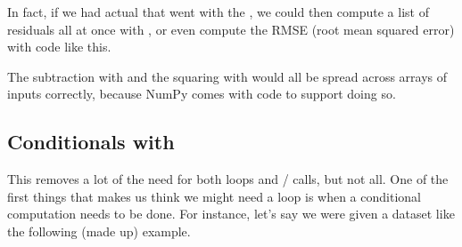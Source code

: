 \documentclass[letterpaper,10pt,english]{sphinxmanual}
\begin{document}
\begin{sphinxVerbatim}[commandchars=\\\{\}]
      
\end{sphinxVerbatim}

In fact, if we had actual  that went with the , we could then compute a list of residuals all at once with , or even compute the RMSE (root mean squared error) with code like this.

\begin{sphinxVerbatim}[commandchars=\\\{\}]
              
\end{sphinxVerbatim}

The subtraction with \sphinxcode{\sphinxupquote{\sphinxhyphen{}}} and the squaring with  would all be spread across arrays of inputs correctly, because NumPy comes with code to support doing so.


\subsection{Conditionals with }
\label{\detokenize{chapter-11-processing-rows:conditionals-with-np-where}}
This removes a lot of the need for both loops and / calls, but not all.  One of the first things that makes us think we might need a loop is when a conditional computation needs to be done.  For instance, let’s say we were given a dataset like the following (made up) example.
\end{document}

